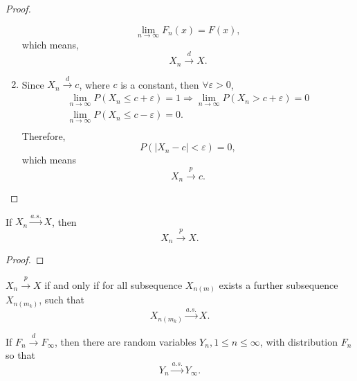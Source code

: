 \begin{proof}
\begin{enumerate}
		      \begin{equation*}
			      \lim_{n\rightarrow\infty}F_n(x)=F(x),
		      \end{equation*}
		      which means,
		      \begin{equation*}
			      X_n\stackrel{d}{\rightarrow}X.
		      \end{equation*}
		\item
		      Since $X_{n}\stackrel{d}{\rightarrow}c$, where $c$ is a constant, then $\forall\varepsilon>0$,
		      \begin{equation*}
			      \begin{gathered}
				      \lim_{n\rightarrow\infty}P(X_n\leq c+\varepsilon)=1\Rightarrow\lim_{n\rightarrow\infty}P(X_n>c+\varepsilon)=0\\
				      \lim_{n\rightarrow\infty}P(X_n\leq c-\varepsilon)=0.\\
			      \end{gathered}
		      \end{equation*}
		      Therefore,
		      \begin{equation*}
			      P\left(\left|X_n-c\right|<\varepsilon\right)=0,
		      \end{equation*}
		      which means
		      \begin{equation*}
			      X_n\stackrel{p}{\rightarrow}c.
		      \end{equation*}
	\end{enumerate}
\end{proof}

\begin{theorem}
	If $X_{n}\stackrel{a.s.}{\rightarrow}X$, then
	\begin{equation}
		X_{n}\stackrel{p}{\rightarrow}X.
	\end{equation}
\end{theorem}

\begin{proof}

\end{proof}

\begin{theorem}
	$X_n\stackrel{p}{\rightarrow}X$ if and only if for all subsequence $X_{n(m)}$ exists a further subsequence $X_{n(m_k)}$, such that
	\begin{equation}
		X_{n(m_k)}\stackrel{a.s.}{\rightarrow}X.
	\end{equation}
\end{theorem}

\begin{lemma} \label{lem:distribution-to-probability}
	If $F_n\stackrel{d}{\rightarrow}F_\infty$, then there are random variables $Y_n,1\leq n\leq \infty$, with distribution $F_n$ so that
	\begin{equation}
		Y_n\stackrel{a.s.}{\rightarrow}Y_\infty.
	\end{equation}
\end{lemma}

